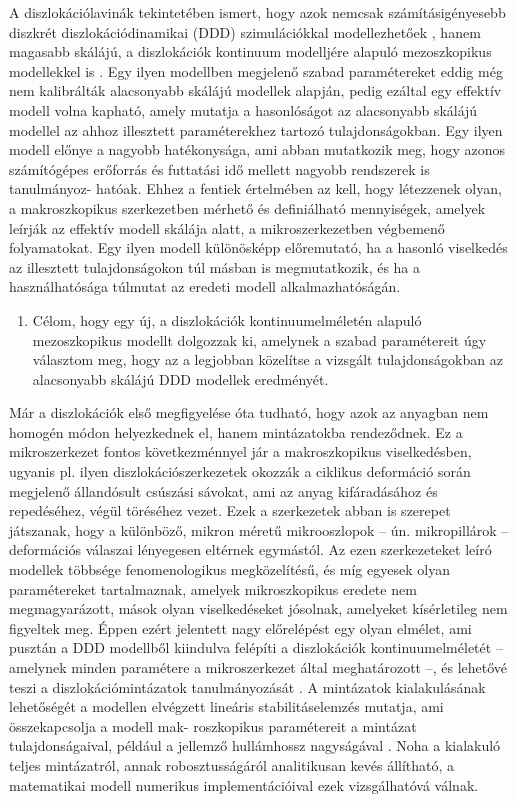 \documentclass[a5paper,twoside,10pt]{article}
\begin{document}
A diszlokációlavinák tekintetében ismert, hogy azok nemcsak számításigényesebb diszkrét diszlokációdinamikai (DDD) szimulációkkal modellezhetőek \cite{PhysRevLett.112.235501}, hanem magasabb skálájú, a diszlokációk kontinuum modelljére alapuló mezoszkopikus modellekkel is \cite{1742-5468-2005-08-P08004}. Egy ilyen modellben megjelenő szabad paramétereket eddig még nem kalibrálták alacsonyabb skálájú modellek alapján, pedig ezáltal egy effektív modell volna kapható, amely mutatja a hasonlóságot az alacsonyabb skálájú modellel az ahhoz illesztett paraméterekhez tartozó tulajdonságokban. Egy ilyen modell előnye a nagyobb hatékonysága, ami abban mutatkozik meg, hogy azonos számítógépes erőforrás és futtatási idő mellett nagyobb rendszerek is tanulmányoz- hatóak. Ehhez a fentiek értelmében az kell, hogy létezzenek olyan, a makroszkopikus szerkezetben mérhető és definiálható mennyiségek, amelyek leírják az effektív modell skálája alatt, a mikroszerkezetben végbemenő folyamatokat. Egy ilyen modell különösképp előremutató, ha a hasonló viselkedés az illesztett tulajdonságokon túl másban is megmutatkozik, és ha a használhatósága túlmutat az eredeti modell alkalmazhatóságán.

\begin{enumerate}
\setcounter{enumi}{0}
\item Célom, hogy egy új, a diszlokációk kontinuumelméletén alapuló mezoszkopikus modellt dolgozzak ki, amelynek a szabad paramétereit úgy választom meg, hogy az a legjobban közelítse a vizsgált tulajdonságokban az alacsonyabb skálájú DDD modellek eredményét.
\end{enumerate}

Már a diszlokációk első megfigyelése óta tudható, hogy azok az anyagban nem homogén módon helyezkednek el, hanem mintázatokba rendeződnek. Ez a mikroszerkezet fontos következménnyel jár a makroszkopikus viselkedésben, ugyanis pl. ilyen diszlokációszerkezetek okozzák a ciklikus deformáció során megjelenő állandósult csúszási sávokat, ami az anyag kifáradásához és repedéséhez, végül töréséhez vezet. Ezek a szerkezetek abban is szerepet játszanak, hogy a különböző, mikron méretű mikrooszlopok – ún. mikropillárok -- deformációs válaszai lényegesen eltérnek egymástól. Az ezen szerkezeteket leíró modellek többsége fenomenologikus megközelítésű, és míg egyesek olyan paramétereket tartalmaznak, amelyek mikroszkopikus eredete nem megmagyarázott, mások olyan viselkedéseket jósolnak, amelyeket kísérletileg nem figyeltek meg. Éppen ezért jelentett nagy előrelépést egy olyan elmélet, ami pusztán a DDD modellből kiindulva felépíti a diszlokációk kontinuumelméletét -- \mbox{amelynek} minden paramétere a mikroszerkezet által meghatározott --, és lehetővé teszi a diszlokációmintázatok tanulmányozását \cite{PhysRevB.93.214110}. A mintázatok kialakulásának lehetőségét a modellen elvégzett lineáris stabilitáselemzés mutatja, ami összekapcsolja a modell mak- roszkopikus paramétereit a mintázat tulajdonságaival, például a jellemző hullámhossz nagyságával \cite{PhysRevB.93.214110}. Noha a kialakuló teljes mintázatról, annak robosztusságáról analitikusan kevés állítható, a matematikai modell numerikus implementációival ezek vizsgálhatóvá válnak.
\end{document}
